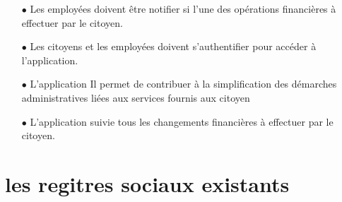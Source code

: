 \begin{itemize}
   \item[$\bullet$]  Les employées doivent être notifier si l'une des opérations financières à effectuer par le citoyen.\\
  \item[$\bullet$]  Les citoyens et les employées doivent s'authentifier pour accéder à l'application.\\
   \item[$\bullet$] L'application Il permet de  contribuer à la simplification des démarches administratives liées aux services fournis aux citoyen
   \\
   \item[$\bullet$] L’application 
 suivie tous les  changements  financières à effectuer par le citoyen.

\end{itemize}
\newpage
\subsection*{}
\section{les regitres sociaux existants}
